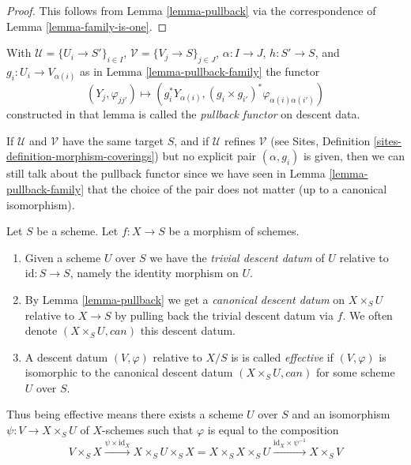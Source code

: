 \begin{proof}
This follows from Lemma \ref{lemma-pullback} via the
correspondence of Lemma \ref{lemma-family-is-one}.
\end{proof}

\begin{definition}
\label{definition-pullback-functor-family}
With $\mathcal{U} = \{U_i \to S'\}_{i \in I}$,
$\mathcal{V} = \{V_j \to S\}_{j \in J}$, $\alpha : I \to J$, $h : S' \to S$,
and $g_i : U_i \to V_{\alpha(i)}$ as in Lemma \ref{lemma-pullback-family}
the functor
$$
(Y_j, \varphi_{jj'}) \longmapsto
(g_i^*Y_{\alpha(i)}, (g_i \times g_{i'})^*\varphi_{\alpha(i)\alpha(i')})
$$
constructed in that lemma
is called the {\it pullback functor} on descent data.
\end{definition}

\noindent
If $\mathcal{U}$ and $\mathcal{V}$ have the same target $S$,
and if $\mathcal{U}$ refines $\mathcal{V}$ (see
Sites, Definition \ref{sites-definition-morphism-coverings})
but no explicit pair $(\alpha, g_i)$ is given, then we can still
talk about the pullback functor since we have seen in
Lemma \ref{lemma-pullback-family} that the choice of the pair does not matter
(up to a canonical isomorphism).


\begin{definition}
\label{definition-effective}
Let $S$ be a scheme.
Let $f : X \to S$ be a morphism of schemes.
\begin{enumerate}
\item  Given a scheme $U$ over $S$ we have the
{\it trivial descent datum} of $U$ relative to
$\text{id} : S \to S$, namely the identity morphism on $U$.
\item By Lemma \ref{lemma-pullback} we get a
{\it canonical descent datum} on $X \times_S U$
relative to $X \to S$ by pulling back the trivial
descent datum via $f$. We often
denote $(X \times_S U, can)$ this descent datum.
\item A descent datum $(V, \varphi)$ relative to $X/S$ is
is called {\it effective} if $(V, \varphi)$
is isomorphic to the canonical descent datum
$(X \times_S U, can)$ for some scheme $U$ over $S$.
\end{enumerate}
\end{definition}

\noindent
Thus being effective means there exists a scheme $U$
over $S$ and an isomorphism $\psi : V \to X \times_S U$
of $X$-schemes such that $\varphi$ is equal to the composition
$$
V \times_S X \xrightarrow{\psi \times \text{id}_X}
X \times_S U \times_S X =
X \times_S X \times_S U
\xrightarrow{\text{id}_X \times \psi^{-1}}
X \times_S V
$$

